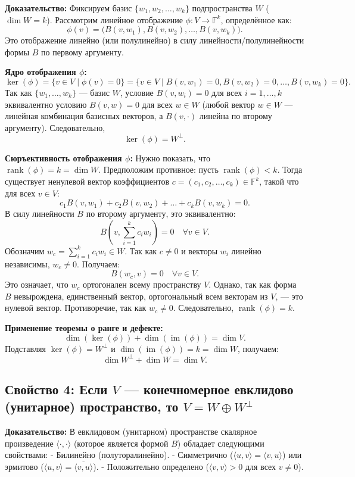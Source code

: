 \documentclass[12pt]{article}
\begin{document}
\textbf{Доказательство:}  
Фиксируем базис $\{w_1, w_2, \dots, w_k\}$ подпространства $W$ ($\dim W = k$). Рассмотрим линейное отображение $\phi : V \to \mathbb{F}^k$, определённое как:  
$$
\phi(v) = \big(B(v, w_1), B(v, w_2), \dots, B(v, w_k)\big).
$$  
Это отображение линейно (или полулинейно) в силу линейности/полулинейности формы $B$ по первому аргументу.

\textbf{Ядро отображения $\phi$:}  
$$
\ker(\phi) = \{v \in V \mid \phi(v) = 0\} = \{v \in V \mid B(v, w_1) = 0, B(v, w_2) = 0, \dots, B(v, w_k) = 0\}.
$$  
Так как $\{w_1, \dots, w_k\}$ — базис $W$, условие $B(v, w_i) = 0$ для всех $i = 1, \dots, k$ эквивалентно условию $B(v, w) = 0$ для всех $w \in W$ (любой вектор $w \in W$ — линейная комбинация базисных векторов, а $B(v, \cdot)$ линейна по второму аргументу). Следовательно,  
$$
\ker(\phi) = W^\perp.
$$  

\textbf{Сюръективность отображения $\phi$:}  
Нужно показать, что $\operatorname{rank}(\phi) = k = \dim W$. Предположим противное: пусть $\operatorname{rank}(\phi) < k$. Тогда существует ненулевой вектор коэффициентов $c = (c_1, c_2, \dots, c_k) \in \mathbb{F}^k$, такой что для всех $v \in V$:  
$$
c_1 B(v, w_1) + c_2 B(v, w_2) + \dots + c_k B(v, w_k) = 0.
$$  
В силу линейности $B$ по второму аргументу, это эквивалентно:  
$$
B\left(v, \sum_{i=1}^k c_i w_i \right) = 0 \quad \forall v \in V.
$$  
Обозначим $w_c = \sum_{i=1}^k c_i w_i \in W$. Так как $c \neq 0$ и векторы $w_i$ линейно независимы, $w_c \neq 0$. Получаем:  
$$
B(w_c, v) = 0 \quad \forall v \in V.
$$  
Это означает, что $w_c$ ортогонален всему пространству $V$. Однако, так как форма $B$ невырождена, единственный вектор, ортогональный всем векторам из $V$, — это нулевой вектор. Противоречие, так как $w_c \neq 0$. Следовательно, $\operatorname{rank}(\phi) = k$.

\textbf{Применение теоремы о ранге и дефекте:}  
$$
\dim(\ker(\phi)) + \dim(\operatorname{im}(\phi)) = \dim V.
$$  
Подставляя $\ker(\phi) = W^\perp$ и $\dim(\operatorname{im}(\phi)) = k = \dim W$, получаем:  
$$
\dim W^\perp + \dim W = \dim V.
$$  


\subsection*{Свойство 4: Если $V$ — конечномерное евклидово (унитарное) пространство, то $V = W \oplus W^\perp$}

\textbf{Доказательство:}  
В евклидовом (унитарном) пространстве скалярное произведение $\langle \cdot, \cdot \rangle$ (которое является формой $B$) обладает следующими свойствами:  
- Билинейно (полуторалинейно).  
- Симметрично ($\langle u, v \rangle = \langle v, u \rangle$) или эрмитово ($\langle u, v \rangle = \overline{\langle v, u \rangle}$).  
- Положительно определено ($\langle v, v \rangle > 0$ для всех $v \neq 0$).  
\end{document}
